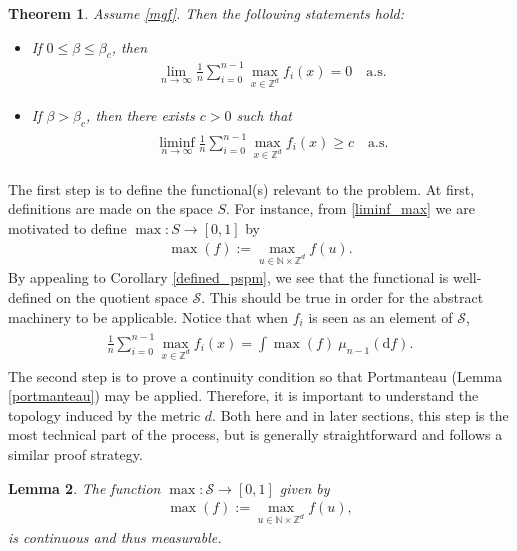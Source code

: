 \documentclass[11pt,reqno]{amsart}
\numberwithin{equation}{section}
\newtheorem{thm}{Theorem}[section]
\newtheorem{lemma}[thm]{Lemma}
\theoremstyle{definition}
\begin{document}
\begin{thm} \label{reprove_equivalence}
Assume \eqref{mgf}.
Then the following statements hold:
\begin{itemize}
\item[(a)] If $0 \leq \beta \leq \beta_c$, then
{\begin{align*} {
\lim_{n \to \infty} \frac{1}{n} \sum_{i = 0}^{n-1} \max_{x \in {\mathbb{Z}}^d} f_i(x) = 0 
 \quad \mathrm{a.s.}
 } \end{align*}}
\item[(b)] If $\beta > \beta_c$, then there exists $c > 0$ such that
{\begin{align} \begin{split} {
\liminf_{n \to \infty} \frac{1}{n} \sum_{i = 0}^{n-1}  \max_{x \in {\mathbb{Z}}^d} f_i(x) \geq c \quad \mathrm{a.s.} \label{liminf_max}
} \end{split} \end{align}}
 \end{itemize}
\end{thm}
The first step is to define the functional(s) relevant to the problem.
At first, definitions are made on the space $S$.
For instance, from \eqref{liminf_max} we are motivated to define $\max : S \to [0,1]$ by
{\begin{align*} {
\max(f) := \max_{u \in {\mathbb{N}} \times {\mathbb{Z}}^d} f(u).
} \end{align*}}
By appealing to Corollary \ref{defined_pspm}, we see that the functional is well-defined on the quotient space ${\mathcal{S}}$.
This should be true in order for the abstract machinery to be applicable.
Notice that when $f_i$ is seen as an element of ${\mathcal{S}}$,
{\begin{align} \begin{split} {
\frac{1}{n} \sum_{i = 0}^{n-1} \max_{x \in {\mathbb{Z}}^d} f_i(x) = \int \max(f)\ \mu_{n-1}({\mathrm{d}} f). \label{max_abstract}
} \end{split} \end{align}}
The second step is to prove a continuity condition so that Portmanteau (Lemma \ref{portmanteau}) may be applied.
Therefore, it is important to understand the topology induced by the metric $d$.
Both here and in later sections, this step is the most technical part of the process, but is generally straightforward and follows a similar proof strategy.

\begin{lemma} \label{max_lemma}
The function $\max : {\mathcal{S}} \to [0,1]$ given by
{\begin{align*} {
\max(f) := \max_{u \in {\mathbb{N}} \times {\mathbb{Z}}^d} f(u),
} \end{align*}}
is continuous and thus measurable.
\end{lemma}
\end{document}

